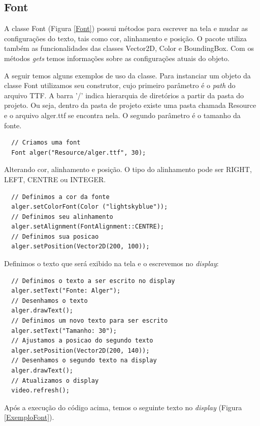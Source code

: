 \subsection{Font}
%
%
A classe Font (Figura \ref{Font}) possui métodos para escrever na tela e mudar as configurações do texto, tais como cor, alinhamento e posição. O pacote utiliza também as funcionalidades das classes Vector2D, Color e BoundingBox. Com os métodos \textit{gets} temos informações sobre as configurações atuais do objeto.
\par 
A seguir temos alguns exemplos de uso da classe. Para instanciar um objeto da classe Font utilizamos seu construtor, cujo primeiro parâmetro é o \textit{path} do arquivo TTF. A barra '/' indica hierarquia de diretórios a partir da pasta do projeto. Ou seja, dentro da pasta de projeto existe uma pasta chamada Resource e o arquivo alger.ttf se encontra nela. O segundo parâmetro é o tamanho da fonte.
%
\begin{lstlisting}
  // Criamos uma font
  Font alger("Resource/alger.ttf", 30);
\end{lstlisting}
%
\par
Alterando cor, alinhamento e posição. O tipo do alinhamento pode ser RIGHT, LEFT, CENTRE ou INTEGER.
%
\begin{lstlisting}
  // Definimos a cor da fonte
  alger.setColorFont(Color ("lightskyblue"));
  // Definimos seu alinhamento
  alger.setAlignment(FontAlignment::CENTRE);
  // Definimos sua posicao
  alger.setPosition(Vector2D(200, 100));
\end{lstlisting}
%
\par 
Definimos o texto que será exibido na tela e o escrevemos no \textit{display}:
%
\begin{lstlisting}
  // Definimos o texto a ser escrito no display
  alger.setText("Fonte: Alger");
  // Desenhamos o texto
  alger.drawText();
  // Definimos um novo texto para ser escrito
  alger.setText("Tamanho: 30");
  // Ajustamos a posicao do segundo texto
  alger.setPosition(Vector2D(200, 140));
  // Desenhamos o segundo texto na display
  alger.drawText();
  // Atualizamos o display
  video.refresh();
\end{lstlisting}
%
Após a execução do código acima, temos o seguinte texto no \textit{display} (Figura \ref{ExemploFont}).
%
%
%
